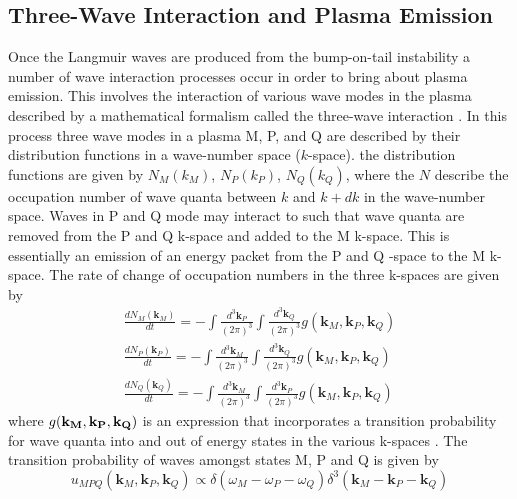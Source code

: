 

\subsection{Three-Wave Interaction and Plasma Emission}\label{sec:32}

Once the Langmuir waves are produced from the bump-on-tail instability a number of wave interaction processes occur in order to bring about plasma emission. This involves the interaction of various wave modes in the plasma described by a mathematical formalism called the three-wave interaction \citep{robinson1993, robinson1994}. In this process three wave modes in a plasma M, P, and Q are described by their distribution functions in a wave-number space ($k$-space). the distribution functions are given by $N_M(k_M)$, $N_P(k_P)$, $N_Q(k_Q)$, where the $N$ describe the occupation number of wave quanta between $k$ and $k+dk$ in the wave-number space. Waves in P and Q mode may interact to such that wave quanta are removed from the P and Q k-space and added to the M k-space. This is essentially an emission of an energy packet from the P and Q -space to the M k-space. The rate of change of occupation numbers in the three k-spaces are given by
\begin{eqnarray}
\frac{dN_M(\mathbf{k}_M)}{dt} = -\int \frac{d^3\mathbf{k}_P}{(2\pi)^3}\int \frac{d^3\mathbf{k}_Q}{(2\pi)^3}g(\mathbf{k}_M, \mathbf{k}_P, \mathbf{k}_Q) \\
%
\frac{dN_P(\mathbf{k}_P)}{dt} = -\int \frac{d^3\mathbf{k}_M}{(2\pi)^3}\int \frac{d^3\mathbf{k}_Q}{(2\pi)^3}g(\mathbf{k}_M, \mathbf{k}_P, \mathbf{k}_Q) \\
%
\frac{dN_Q(\mathbf{k}_Q)}{dt} = -\int \frac{d^3\mathbf{k}_M}{(2\pi)^3}\int \frac{d^3\mathbf{k}_P}{(2\pi)^3}g(\mathbf{k}_M, \mathbf{k}_P, \mathbf{k}_Q)
\end{eqnarray}
where $g(\bf{k}_M, \bf{k}_P, \bf{k}_Q)$ is an expression that incorporates a transition probability for wave quanta into and out of energy states in the various k-spaces \citep{robinson1994}. The transition probability of waves amongst states M, P and Q is given by \citep{melrose1986}
\begin{equation}
u_{MPQ}(\mathbf{k}_M, \mathbf{k}_P, \mathbf{k}_Q)  \propto \delta(\omega_M - \omega_P - \omega_Q ) \delta^3(\mathbf{k}_M - \mathbf{k}_P - \mathbf{k}_Q )
\end{equation}
